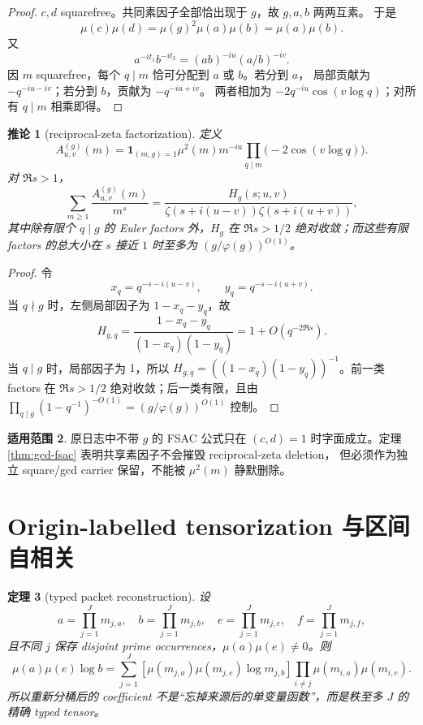 \documentclass[11pt,a4paper]{ctexart}
\newtheorem{theorem}{定理}[section]
\newtheorem{corollary}[theorem]{推论}
\theoremstyle{definition}
\newtheorem{remark}[theorem]{适用范围}
\newcommand{\1}{\mathbf 1}
\begin{document}
\begin{proof}
$c,d$ squarefree。共同素因子全部恰出现于 $g$，故 $g,a,b$ 两两互素。
于是
\[
\mu(c)\mu(d)=\mu(g)^2\mu(a)\mu(b)=\mu(a)\mu(b).
\]
又
\[
a^{-it_1}b^{-it_2}=(ab)^{-iu}(a/b)^{-iv}.
\]
因 $m$ squarefree，每个 $q\mid m$ 恰可分配到 $a$ 或 $b$。若分到 $a$，
局部贡献为 $-q^{-iu-iv}$；若分到 $b$，贡献为 $-q^{-iu+iv}$。
两者相加为 $-2q^{-iu}\cos(v\log q)$；对所有 $q\mid m$ 相乘即得。
\end{proof}

\begin{corollary}[reciprocal-zeta factorization]\label{cor:gcd-zeta}
定义
\[
A^{(g)}_{u,v}(m)=
\mathbf1_{(m,g)=1}\mu^2(m)m^{-iu}
\prod_{q\mid m}\bigl(-2\cos(v\log q)\bigr).
\tag{13.4}
\]
对 $\Re s>1$，
\[
\sum_{m\ge1}\frac{A^{(g)}_{u,v}(m)}{m^s}
=\frac{H_g(s;u,v)}
{\zeta(s+i(u-v))\zeta(s+i(u+v))},
\tag{13.5}
\]
其中除有限个 $q\mid g$ 的 Euler factors 外，$H_g$ 在 $\Re s>1/2$
绝对收敛；而这些有限 factors 的总大小在 $s$ 接近 $1$ 时至多为
$(g/\varphi(g))^{O(1)}$。
\end{corollary}

\begin{proof}
令
\[
x_q=q^{-s-i(u-v)},\qquad y_q=q^{-s-i(u+v)}.
\]
当 $q\nmid g$ 时，左侧局部因子为 $1-x_q-y_q$，故
\[
H_{g,q}=\frac{1-x_q-y_q}{(1-x_q)(1-y_q)}
=1+O(q^{-2\Re s}).
\]
当 $q\mid g$ 时，局部因子为 $1$，所以
$H_{g,q}=((1-x_q)(1-y_q))^{-1}$。前一类 factors 在 $\Re s>1/2$
绝对收敛；后一类有限，且由
$\prod_{q\mid g}(1-q^{-1})^{-O(1)}=(g/\varphi(g))^{O(1)}$ 控制。
\end{proof}

\begin{remark}
原日志中不带 $g$ 的 FSAC 公式只在 $(c,d)=1$ 时字面成立。定理
\ref{thm:gcd-fsac} 表明共享素因子不会摧毁 reciprocal-zeta deletion，
但必须作为独立 square/gcd carrier 保留，不能被 $\mu^2(m)$ 静默删除。
\end{remark}

\section{Origin-labelled tensorization 与区间自相关}

\begin{theorem}[typed packet reconstruction]\label{thm:typed-packet}
设
\[
a=\prod_{j=1}^Jm_{j,a},\quad b=\prod_{j=1}^Jm_{j,b},\quad
e=\prod_{j=1}^Jm_{j,e},\quad f=\prod_{j=1}^Jm_{j,f},
\tag{14.1}
\]
且不同 $j$ 保存 disjoint prime occurrences，$\mu(a)\mu(e)\ne0$。则
\[
\boxed{
\mu(a)\mu(e)\log b
=\sum_{j=1}^{J}
\left[\mu(m_{j,a})\mu(m_{j,e})\log m_{j,b}\right]
\prod_{i\ne j}\mu(m_{i,a})\mu(m_{i,e}).}
\tag{14.2}
\]
所以重新分桶后的 coefficient 不是“忘掉来源后的单变量函数”，而是秩至多
$J$ 的精确 typed tensor。
\end{theorem}
\end{document}
